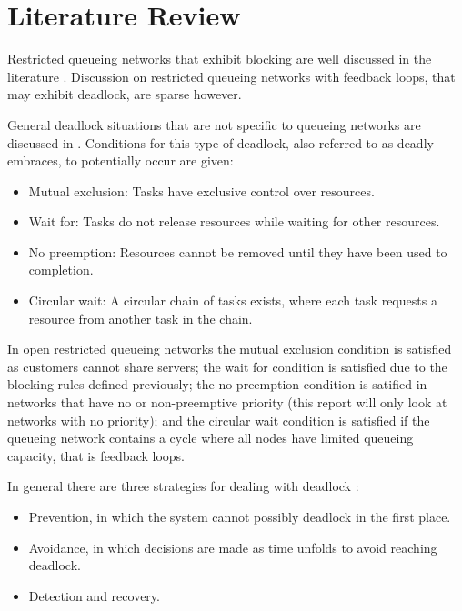 \documentclass{article}
\begin{document}
\section{Literature Review}\label{sec:litreview}


Restricted queueing networks that exhibit blocking are well discussed in the literature \cite{hunt56, baber08, aviitzhakyadin65, takahashi80, koizumietal05, latoucheneuts80, korporaaletal00}. Discussion on restricted queueing networks with feedback loops, that may exhibit deadlock, are sparse however.

General deadlock situations that are not specific to queueing networks are discussed in \cite{coffmanelphick71}.
Conditions for this type of deadlock, also referred to as deadly embraces, to potentially occur are given:
\begin{itemize}
  \item Mutual exclusion: Tasks have exclusive control over resources.
  \item Wait for: Tasks do not release resources while waiting for other resources.
  \item No preemption: Resources cannot be removed until they have been used to completion.
  \item Circular wait: A circular chain of tasks exists, where each task requests a resource from another task in the chain.
\end{itemize}

In open restricted queueing networks the mutual exclusion condition is satisfied as customers cannot share servers; the wait for condition is satisfied due to the blocking rules defined previously; the no preemption condition is satified in networks that have no or non-preemptive priority (this report will only look at networks with no priority); and the circular wait condition is satisfied if the queueing network contains a cycle where all nodes have limited queueing capacity, that is feedback loops.

In general there are three strategies for dealing with deadlock \cite{kawadkaretal14, elmagarmid86}:

\begin{itemize}
  \item Prevention, in which the system cannot possibly deadlock in the first place.
  \item Avoidance, in which decisions are made as time unfolds to avoid reaching deadlock.
  \item Detection and recovery.
\end{itemize}
\end{document}
